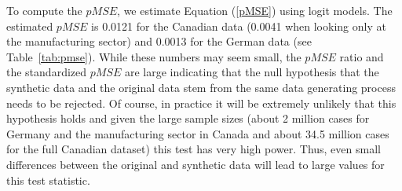 To compute the $pMSE$, we estimate Equation (\ref{pMSE}) using logit models. The estimated $pMSE$ is 0.0121 for the Canadian data (0.0041 when looking only at the manufacturing sector) and 0.0013 for the German data (see Table~\ref{tab:pmse}). While these numbers may seem small, the $pMSE$ ratio and the standardized $pMSE$ are large indicating that the null hypothesis that the synthetic data and the original data stem from the same data generating process needs to be rejected. Of course, in practice it will be extremely unlikely that this hypothesis holds and given the large sample sizes (about 2 million cases for Germany and the manufacturing sector in Canada and about 34.5 million cases for the full Canadian dataset) this test has very high power. Thus, even small differences between the original and synthetic data will lead to large values for this test statistic.



